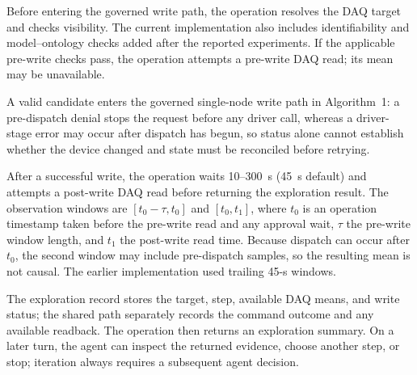 Before entering the governed write path, the operation resolves the DAQ target and checks visibility. The current implementation also includes identifiability and model--ontology checks added after the reported experiments. If the applicable pre-write checks pass, the operation attempts a pre-write DAQ read; its mean may be unavailable.

A valid candidate enters the governed single-node write path in Algorithm~1: a pre-dispatch denial stops the request before any driver call, whereas a driver-stage error may occur after dispatch has begun, so status alone cannot establish whether the device changed and state must be reconciled before retrying.

After a successful write, the operation waits 10--300~s (45~s default) and attempts a post-write DAQ read before returning the exploration result. The observation windows are $[t_0-\tau,t_0]$ and $[t_0,t_1]$, where $t_0$ is an operation timestamp taken before the pre-write read and any approval wait, $\tau$ the pre-write window length, and $t_1$ the post-write read time. Because dispatch can occur after $t_0$, the second window may include pre-dispatch samples, so the resulting mean is not causal. The earlier implementation used trailing 45-s windows.

The exploration record stores the target, step, available DAQ means, and write status; the shared path separately records the command outcome and any available readback. The operation then returns an exploration summary. On a later turn, the agent can inspect the returned evidence, choose another step, or stop; iteration always requires a subsequent agent decision.


